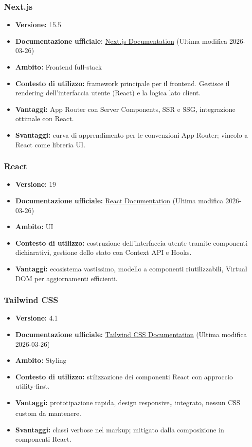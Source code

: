 \documentclass[a4paper, 11pt, oneside]{scrartcl}
\begin{document}
\subsubsection{Next.js}
\begin{itemize}[noitemsep]
\item \textbf{Versione:} 15.5
\item \textbf{Documentazione ufficiale:} \href{https://nextjs.org/docs}{Next.js Documentation} (Ultima modifica 2026-03-26)
\item \textbf{Ambito:} Frontend full-stack
\item \textbf{Contesto di utilizzo:} framework principale per il frontend. Gestisce il rendering dell'interfaccia utente (React) e la logica lato client.
\item \textbf{Vantaggi:} App Router con Server Components, SSR e SSG, integrazione ottimale con React.
\item \textbf{Svantaggi:} curva di apprendimento per le convenzioni App Router; vincolo a React come libreria UI.
\end{itemize}

\subsubsection{React}
\begin{itemize}[noitemsep]
\item \textbf{Versione:} 19
\item \textbf{Documentazione ufficiale:} \href{https://react.dev/learn}{React Documentation} (Ultima modifica 2026-03-26)
\item \textbf{Ambito:} UI
\item \textbf{Contesto di utilizzo:} costruzione dell'interfaccia utente tramite componenti dichiarativi, gestione dello stato con Context API e Hooks.
\item \textbf{Vantaggi:} ecosistema vastissimo, modello a componenti riutilizzabili, Virtual DOM per aggiornamenti efficienti.
\end{itemize}

\subsubsection{Tailwind CSS}
\begin{itemize}[noitemsep]
\item \textbf{Versione:} 4.1
\item \textbf{Documentazione ufficiale:} \href{https://tailwindcss.com/docs}{Tailwind CSS Documentation} (Ultima modifica 2026-03-26)
\item \textbf{Ambito:} Styling
\item \textbf{Contesto di utilizzo:} stilizzazione dei componenti React con approccio utility-first.
\item \textbf{Vantaggi:} prototipazione rapida, design responsive\textsubscript{\textsc{g}} integrato, nessun CSS custom da mantenere.
\item \textbf{Svantaggi:} classi verbose nel markup; mitigato dalla composizione in componenti React.
\end{itemize}
\end{document}

